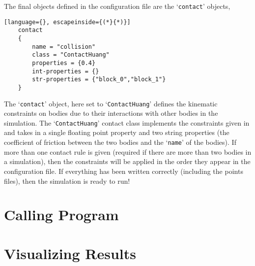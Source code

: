 The final objects defined in the configuration file are the `\texttt{contact}' objects,
\begin{lstlisting}[language={}, escapeinside={(*}{*)}]
    contact
    {
        name = "collision"
        class = "ContactHuang"
        properties = {0.4}
        int-properties = {}
        str-properties = {"block_0","block_1"}
    }
\end{lstlisting}
The `\texttt{contact}' object, here set to `\texttt{ContactHuang}' defines the kinematic constraints on bodies due to their interactions with other bodies in the simulation. The `\texttt{ContactHuang}' contact class implements the constraints given in \cite{huang2011} and takes in a single floating point property and two string properties (the coefficient of friction between the two bodies and the `\texttt{name}' of the bodies). If more than one contact rule is given (required if there are more than two bodies in a simulation), then the constraints will be applied in the order they appear in the configuration file.
If everything has been written correctly (including the points files), then the simulation is ready to run!

\section{Calling Program}

\section{Visualizing Results}